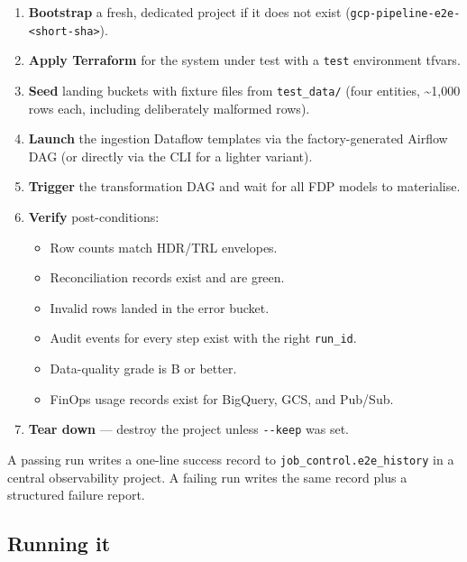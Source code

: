 \documentclass[
  11pt,
  british,
  oneside]{book}
\providecommand{\tightlist}{%
  \setlength{\itemsep}{0pt}\setlength{\parskip}{0pt}}
\begin{document}
\begin{enumerate}
\def\labelenumi{\arabic{enumi}.}
\tightlist
\item
  \textbf{Bootstrap} a fresh, dedicated project if it does not exist
  (\texttt{gcp-pipeline-e2e-\textless{}short-sha\textgreater{}}).
\item
  \textbf{Apply Terraform} for the system under test with a
  \texttt{test} environment tfvars.
\item
  \textbf{Seed} landing buckets with fixture files from
  \texttt{test\_data/} (four entities, \textasciitilde1,000 rows each,
  including deliberately malformed rows).
\item
  \textbf{Launch} the ingestion Dataflow templates via the
  factory-generated Airflow DAG (or directly via the CLI for a lighter
  variant).
\item
  \textbf{Trigger} the transformation DAG and wait for all FDP models to
  materialise.
\item
  \textbf{Verify} post-conditions:

  \begin{itemize}
  \tightlist
  \item
    Row counts match HDR/TRL envelopes.
  \item
    Reconciliation records exist and are green.
  \item
    Invalid rows landed in the error bucket.
  \item
    Audit events for every step exist with the right \texttt{run\_id}.
  \item
    Data-quality grade is B or better.
  \item
    FinOps usage records exist for BigQuery, GCS, and Pub/Sub.
  \end{itemize}
\item
  \textbf{Tear down} --- destroy the project unless \texttt{-\/-keep}
  was set.
\end{enumerate}

A passing run writes a one-line success record to
\texttt{job\_control.e2e\_history} in a central observability project. A
failing run writes the same record plus a structured failure report.

\hypertarget{running-it}{%
\subsection{Running it}\label{running-it}}
\end{document}
